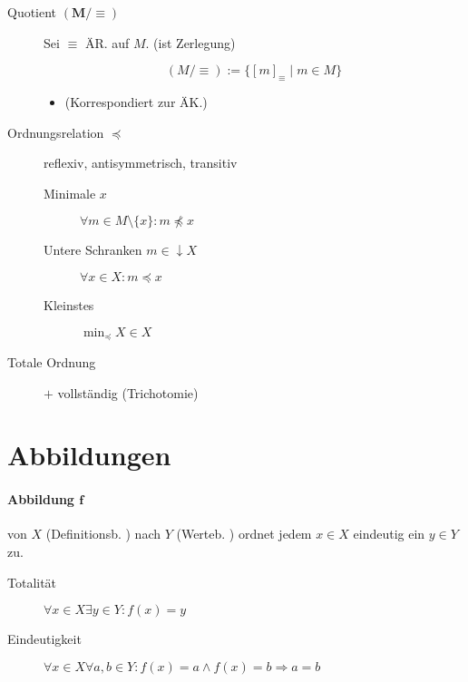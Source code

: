 \begin{mzImportant}
\begin{description}
    \item [Quotient $\mathbf{(M / \equiv)}$]
          Sei $\equiv$ ÄR. auf $M$. (ist Zerlegung)

          $$(M / \equiv) := \{ [m]_\equiv \mid m \in M \}$$

          \begin{itemize}
            \item (Korrespondiert zur ÄK.)
          \end{itemize}

    \item [Ordnungsrelation $\boldsymbol{\preceq}$]
          reflexiv, antisymmetrisch, transitiv

          \begin{description}
            \item [Minimale $x$] $\forall m \in M \setminus \{ x \}: m \not\preceq x$

            \item [Untere Schranken $m \in \downarrow X$] $\forall x \in X: m \preceq x$

            \item [Kleinstes] $\min_\preceq X \in X$
          \end{description}

    \item [Totale Ordnung] $+$ vollständig (Trichotomie)
  \end{description}
\end{mzImportant}

\section{Abbildungen}

\paragraph{Abbildung $\mathbf{f}$}
von $X$ (Definitionsb. ) nach $Y$ (Werteb. ) ordnet jedem $x \in X$ eindeutig ein $y \in Y$ zu.

\begin{description}
  \item[Totalität] $\forall x \in X \exists y \in Y: f(x) = y$
  \item[Eindeutigkeit] $\forall x \in X \forall a, b \in Y: f(x) = a \land f(x) = b \Rightarrow a = b$
\end{description}

